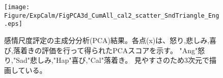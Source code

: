 
\begin{figure}[h]
  \vspace{40pt}
  \hspace{20pt}
  \centering
  \texttt{[image: Figure/ExpCalm/FigPCA3d\_CumAll\_cal2\_scatter\_SndTriangle\_Eng.eps]}
  \caption{感情尺度評定の主成分分析(PCA)結果。各点(x)は、怒り,悲しみ,喜び,落着きの評価を行って得られたPCAスコアを示す。
            "Ang"怒り,"Sad"悲しみ,"Hap"喜び,"Cal"落着き。 見やすさのため3次元で描画している。}
\end{figure}



  
  
  


